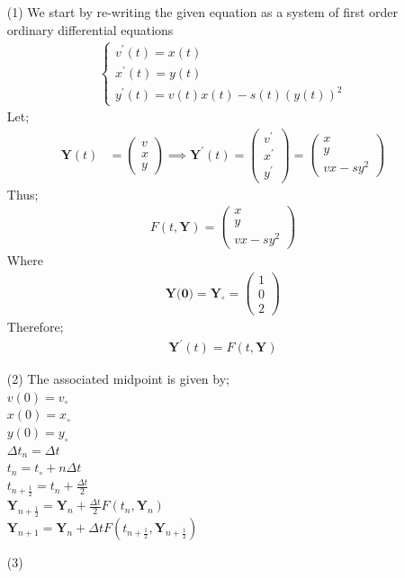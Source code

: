 \documentclass[12pt,a4paper]{article}
\begin{document}
\begin{itemize}
	\item [(1)]
	We start by re-writing the given equation as a system of first order ordinary differential equations
	\begin{align*}
	\begin{cases}
	v^{\prime}(t)=x(t)\\
	x^{\prime}(t)=y(t)\\
	y^{\prime}(t)=v(t)x(t)-s(t)(y(t))^{2}
	\end{cases}
	\end{align*}
	Let;
	\begin{align}
	\textbf{Y}(t)&=\begin{pmatrix}
	v\\x\\y
	\end{pmatrix}\implies \textbf{Y}^{\prime}(t)= \begin{pmatrix}
	v^{\prime}\\
	x^{\prime}\\
	y^{\prime}
	\end{pmatrix}=\begin{pmatrix}
	x\\
	y\\
	vx-sy^{2}
	\end{pmatrix} \label{1}
	\end{align}
	Thus;
	\begin{align*}
	F(t,\textbf{Y})=\begin{pmatrix}
	x\\
	y\\
	vx-sy^{2}
	\end{pmatrix} 
	\end{align*}
	Where
	\begin{align*}
	\textbf{Y(0)}=\textbf{Y}_{\circ}=\begin{pmatrix}
	1\\0\\2
	\end{pmatrix}
	\end{align*}
	Therefore;
	\begin{align*}
	\textbf{Y}^{\prime}(t)=	F(t,\textbf{Y})
	\end{align*}
	\item[(2)] The associated midpoint is given by;\\
	$v(0)=v_{\circ}$\\
	$x(0)=x_{\circ}$\\
	$y(0)=y_{\circ}$\\
	$\Delta t_{n}=\Delta t$\\
	$t_{n}=t_{\circ}+n\Delta t$\\
	$t_{n+\frac{1}{2}}=t_{n}+\frac{\Delta t}{2}$\\
	$\textbf{Y}_{n+\frac{1}{2}}=\textbf{Y}_{n}+\frac{\Delta t}{2}F(t_{n},\textbf{Y}_{n})$\\
	$\textbf{Y}_{n+1}=\textbf{Y}_{n}+\Delta tF(t_{n+\frac{1}{2}},\textbf{Y}_{n+\frac{1}{2}})$
	\item [(3)]
	

\end{itemize}
\end{document}
